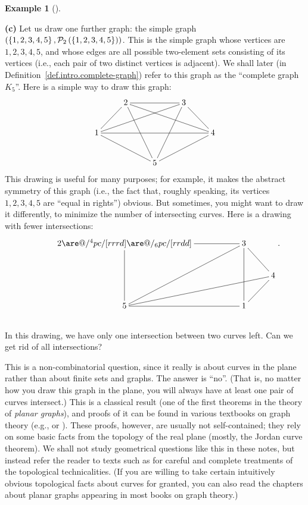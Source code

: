 \documentclass[numbers=enddot,12pt,final,onecolumn,notitlepage]{scrartcl}%
\makeatletter
\theoremstyle{definition}
\newtheorem{exam}[theo]{Example}
\newenvironment{example}[1][]
{\begin{exam}[#1]\begin{leftbar}}
{\end{leftbar}\end{exam}}
\newcommand{\powset}[2][]{\ifthenelse{\equal{#2}{}}{\mathcal{P}\left(#1\right)}{\mathcal{P}_{#1}\left(#2\right)}}
\newcommand{\set}[1]{\left\{ #1 \right\}}
\newcommand{\tup}[1]{\left( #1 \right)}
\newcommand{\are}{\ar@{-}}
\makeatother
\begin{document}
\begin{example}
\textbf{(c)} Let us draw one further graph: the simple graph
$\tup{\set{1, 2, 3, 4, 5}, \powset[2]{\set{1, 2, 3, 4, 5}}}$. This is
the simple graph whose vertices are $1, 2, 3, 4, 5$, and whose edges
are all possible two-element sets consisting of its vertices (i.e.,
each pair of two distinct vertices is adjacent). We shall later (in
Definition~\ref{def.intro.complete-graph}) refer to this graph as
the ``complete graph $K_5$''. Here is a simple way to draw this graph:
\begin{align*}
\xymatrix{
& 2 \are[ld] \are[rr] \are[rrrd] \are[rdd] & & 3 \are[rd] \are[ldd] \are[llld] \\
1 \are[rrrr] \are[rrd] & & & & 4 \are[lld] \\
& & 5
}
\end{align*}
This drawing is useful for many purposes; for example, it makes the
abstract symmetry of this graph (i.e., the fact that, roughly
speaking, its vertices $1,2,3,4,5$ are ``equal in rights'') obvious.
But sometimes, you might want to draw it differently, to minimize the
number of intersecting curves. Here is a drawing with fewer
intersections:
\begin{align*}
\xymatrix{
& 2 \are[rr] \are@/^4pc/[rrrd] \are@/_6pc/[rrdd] \are[dd] & & 3 \are[rd] \are[lldd] \are[dd] \\
& & & & 4 \are[llld] \\
& 5 \are[rr] & & 1 \are[ru]
} . \\
\phantom{a} %
\end{align*}
In this drawing, we have only one intersection between two curves
left. Can we get rid of all intersections?

This is a non-combinatorial question, since it really is about curves
in the plane rather than about finite sets and graphs. The answer is
``no''. (That is, no matter how you draw this graph in the plane, you
will always have at least one pair of curves intersect.) This is a
classical result (one of the first theorems in the theory of
\textit{planar graphs}), and proofs of it can be found in various
textbooks on graph theory (e.g., \cite[Corollary 11.1(d)]{Harary69} or
\cite[Theorem 10.2]{BonMur08}). These proofs, however, are usually not
self-contained; they rely on some basic facts from the topology of the
real plane (mostly, the Jordan curve theorem). We shall not study
geometrical questions like this in these notes, but instead refer the
reader to texts such as \cite{FriFri98} for careful and complete
treatments of the topological technicalities.
(If you are willing to take certain intuitively obvious
topological facts about curves for granted, you can also read the
chapters about planar graphs appearing in most books on graph theory.)
\end{example}
\end{document}
